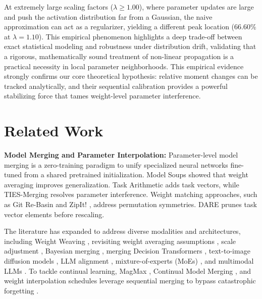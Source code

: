 \documentclass{article}
\theoremstyle{plain}
\theoremstyle{definition}
\theoremstyle{remark}
\begin{document}
At extremely large scaling factors ($\lambda \ge 1.00$), where parameter updates are large and push the activation distribution far from a Gaussian, the naive approximation can act as a regularizer, yielding a different peak location (66.60\% at $\lambda=1.10$). This empirical phenomenon highlights a deep trade-off between exact statistical modeling and robustness under distribution drift, validating that a rigorous, mathematically sound treatment of non-linear propagation is a practical necessity in local parameter neighborhoods.
This empirical evidence strongly confirms our core theoretical hypothesis: relative moment changes can be tracked analytically, and their sequential calibration provides a powerful stabilizing force that tames weight-level parameter interference.

\section{Related Work}
\label{sec:related}

\textbf{Model Merging and Parameter Interpolation:} Parameter-level model merging is a zero-training paradigm to unify specialized neural networks fine-tuned from a shared pretrained initialization. Model Soups \cite{wortsman2022model} showed that weight averaging improves generalization. Task Arithmetic \cite{ilharco2022editing} adds task vectors, while TIES-Merging \cite{yadav2023ties} resolves parameter interference. Weight matching approaches, such as Git Re-Basin \cite{ainsworth2022git} and ZipIt! \cite{stoica2023zipit}, address permutation symmetries. DARE \cite{yu2024language} prunes task vector elements before rescaling.

The literature has expanded to address diverse modalities and architectures, including Weight Weaving \cite{chaves2025weight}, revisiting weight averaging assumptions \cite{choi2024revisiting,wang2024rethinking}, scale adjustment \cite{xu2024weight}, Bayesian merging \cite{maldonado2024how}, merging Decision Transformers \cite{lawson2023merging}, text-to-image diffusion models \cite{biggs2024diffusion}, LLM alignment \cite{roy2025alignmerge}, mixture-of-experts (MoEs) \cite{zhou2025mergeme}, and multimodal LLMs \cite{du2025adamms}. To tackle continual learning, MagMax \cite{marczak2024magmax}, Continual Model Merging \cite{tang2025merging}, and weight interpolation schedules \cite{kozal2024continual} leverage sequential merging to bypass catastrophic forgetting \cite{kirkpatrick2017overcoming}.
\end{document}
